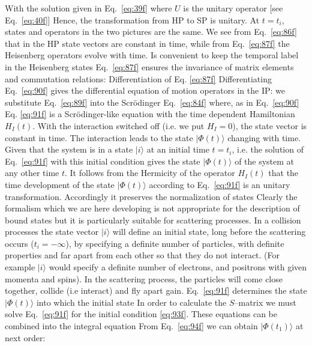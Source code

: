\label{eq:84f}
With the solution given in Eq.~\eqref{eq:39f}
\label{eq:85f}
where $U$ is the unitary operator [see Eq.~\eqref{eq:40f}]
\label{eq:86f}
\label{eq:87f}
Hence, the transformation from HP to SP is unitary. At $t=t_i$, states and operators in the two pictures are the same. We see from Eq.~\eqref{eq:86f} that in the HP state vectors are constant in time, while from Eq.~\eqref{eq:87f} the Heisenberg operators evolve with time. Is convenient to keep the temporal label in the Heisenberg states
Eq.~\eqref{eq:87f} ensures the invariance of matrix elements and commutation relations:
Differentiation of Eq. \eqref{eq:87f} 
\label{eq:88f}
\label{eq:89f}
\label{eq:90f}
Differentiating Eq.~\eqref{eq:90f} gives the differential equation of motion operators in the IP:
we substitute Eq.~\eqref{eq:89f} into the Scr\"odinger Eq.~\eqref{eq:84f}
\label{eq:91f}
where, as in Eq.~\eqref{eq:90f}
  \label{eq:92f}
Eq. \eqref{eq:91f} is a Scr\"odinger-like equation with the time dependent Hamiltonian $H_I(t)$. With the interaction switched off (i.e.  we put $H_I=0$), the state vector is constant in time. The interaction leads to the state $|\Phi(t)\rangle$ changing with time. Given that the system is in a state  $|i\rangle$ at an initial time $t=t_i$, i.e.
\label{eq:93f}
the solution of Eq.~\eqref{eq:91f} with this initial condition gives the state $|\Phi(t)\rangle$ of the system at any other time $t$. It follows from the Hermicity of the operator $H_I(t)$ that the time development of the state $|\Phi(t)\rangle$ according to Eq.~\eqref{eq:91f} is an unitary transformation. Accordingly it preserves the normalization of states
Clearly the formalism which we are here developing is not appropriate for the description of bound states but it is particularly suitable for scattering processes. In a collision processes the state vector $|i\rangle$ will define an initial state, long before the scattering occurs ($t_i=-\infty$), by specifying a definite number of particles, with definite properties and far apart from each other so that they do not interact. (For example $|i\rangle$ would specify a definite number of electrons, and positrons with given momenta and spins). In the scattering process, the particles will come close together, collide (i.e interact) and fly apart gain. Eq.~\eqref{eq:91f} determines the state $|\Phi(t)\rangle$ into which the initial state
In order to calculate the $S$--matrix we must solve Eq.~\eqref{eq:91f} for the initial condition \eqref{eq:93f}. These equations can be combined into the integral equation
\label{eq:94f}
From Eq.~\eqref{eq:94f} we can obtain $|\Phi(t_1)\rangle$ at next order:
